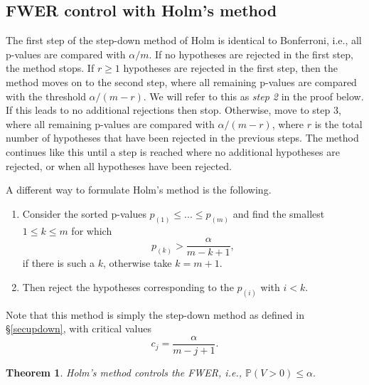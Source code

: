 \documentclass[11pt]{article}
\theoremstyle{plain}
\newtheorem{theorem}{Theorem}[section]
\theoremstyle{definition}
\newcommand{\pr}{\mathbb{P}}
\begin{document}
\subsection{FWER control with Holm's method} \label{secHolm}
The first step of the step-down method of Holm is identical to Bonferroni, i.e., all p-values are compared with $\alpha/m$. If no hypotheses are rejected in the first step, the method stops. If $r\geq 1$ hypotheses are rejected in the first step, then the method moves on to the second step, where all remaining p-values are compared with the threshold $\alpha/(m-r)$. We will refer to this as \emph{step 2} in the proof below. If this leads to no additional rejections then stop. Otherwise, move to step 3, where all remaining p-values are compared with $\alpha/(m-r)$, where $r$ is the total number of hypotheses that have been rejected in the previous steps. The method continues like this until a step is reached where no additional hypotheses are rejected, or when all hypotheses have been rejected. 



A different way to formulate Holm's method is the following. 
\begin{enumerate}
\item Consider the sorted p-values $p_{(1)}\leq ...\leq p_{(m)}$ and find the smallest $1\leq k \leq m$ for which
$$p_{(k)}>\frac{\alpha}{m-k+1},$$
if there is such a $k$, otherwise take $k=m+1$. 
\item Then reject the hypotheses corresponding to the $p_{(i)}$ with $i<k$.
\end{enumerate}
Note that this  method is simply the step-down method as defined in \S\ref{secupdown}, with critical values $$c_j=\frac{\alpha}{m-j+1}.$$



\begin{theorem} \label{thmHolm}
Holm's method controls the FWER, i.e., $\pr(V>0)\leq\alpha.$
\end{theorem}
\end{document}
